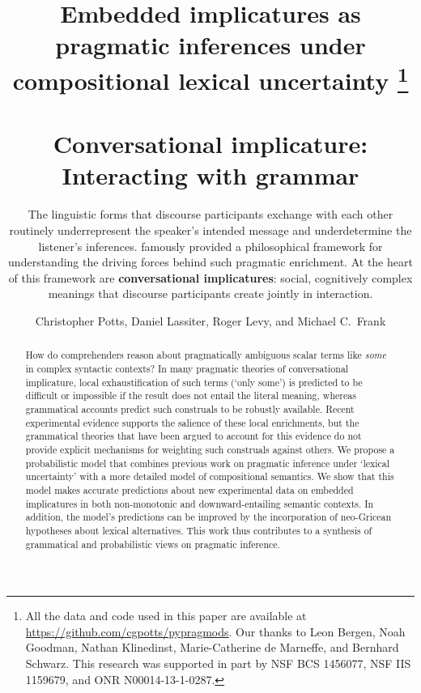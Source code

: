 \documentclass[leqno,12pt]{article}
\newcommand{\word}[1]{\emph{#1}}
\newcommand{\tech}[1]{\textbf{#1}}
\begin{document}
\title{Embedded implicatures as pragmatic inferences under compositional lexical uncertainty%
  \thanks{All the data and code used in this paper are available at \url{https://github.com/cgpotts/pypragmods}.
    Our thanks to 
    Leon Bergen, %
    Noah Goodman, %
    Nathan Klinedinst, %
    Marie-Catherine de Marneffe, and %
    Bernhard Schwarz.
    This research was supported in part by NSF BCS 1456077, NSF IIS 1159679, and ONR N00014-13-1-0287.}
\author{Christopher Potts, Daniel Lassiter, Roger Levy, and Michael C.~Frank}
\maketitle

\begin{abstract} 
  How do comprehenders reason about pragmatically ambiguous scalar
  terms like \word{some} in complex syntactic contexts?  In many
  pragmatic theories of conversational implicature, local
  exhaustification of such terms (`only some') is predicted to be
  difficult or impossible if the result does not entail the literal
  meaning, whereas grammatical accounts predict such construals to be
  robustly available. Recent experimental evidence supports the
  salience of these local enrichments, but the grammatical theories
  that have been argued to account for this evidence do not provide
  explicit mechanisms for weighting such construals against others. We
  propose a probabilistic model that combines previous work on
  pragmatic inference under `lexical uncertainty' with a more detailed
  model of compositional semantics. We show that this model makes
  accurate predictions about new experimental data on embedded
  implicatures in both non-monotonic and downward-entailing semantic
  contexts. In addition, the model's predictions can be improved by
  the incorporation of neo-Gricean hypotheses about lexical
  alternatives. This work thus contributes to a synthesis of
  grammatical and probabilistic views on pragmatic inference.
\end{abstract}



\section{Conversational implicature: Interacting with grammar}\label{sec:introduction}

The linguistic forms that discourse participants exchange with each
other routinely underrepresent the speaker's intended message and
underdetermine the listener's inferences. \citet{Grice75} famously
provided a philosophical framework for understanding the driving
forces behind such pragmatic enrichment. At the heart of this
framework are \tech{conversational implicatures}: social, cognitively
complex meanings that discourse participants create jointly in
interaction.

}
\end{document}
